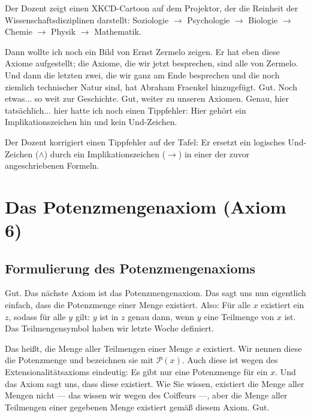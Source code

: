 \begin{meta-note}
Der Dozent zeigt einen XKCD-Cartoon auf dem Projektor, der die Reinheit der Wissenschaftsdisziplinen darstellt: Soziologie $\to$ Psychologie $\to$ Biologie $\to$ Chemie $\to$ Physik $\to$ Mathematik.
\end{meta-note}

\begin{spoken-clean}[00:41:07 - 00:41:37]
Dann wollte ich noch ein Bild von Ernst Zermelo zeigen. Er hat eben diese Axiome aufgestellt; die Axiome, die wir jetzt besprechen, sind alle von Zermelo. Und dann die letzten zwei, die wir ganz am Ende besprechen und die noch ziemlich technischer Natur sind, hat Abraham Fraenkel hinzugefügt. Gut. Noch etwas... so weit zur Geschichte. Gut, weiter zu unseren Axiomen. Genau, hier tatsächlich... hier hatte ich noch einen Tippfehler: Hier gehört ein Implikationszeichen hin und kein Und-Zeichen.
\end{spoken-clean}

\begin{meta-note}[Tafelkorrektur]
Der Dozent korrigiert einen Tippfehler auf der Tafel: Er ersetzt ein logisches Und-Zeichen ($\land$) durch ein Implikationszeichen ($\rightarrow$) in einer der zuvor angeschriebenen Formeln.
\end{meta-note}

\section{Das Potenzmengenaxiom (Axiom 6)}

\subsection{Formulierung des Potenzmengenaxioms}
\begin{spoken-clean}[00:41:37 - 00:43:31]
Gut. Das nächste Axiom ist das Potenzmengenaxiom. Das sagt uns nun eigentlich einfach, dass die Potenzmenge einer Menge existiert. Also: Für alle $x$ existiert ein $z$, sodass für alle $y$ gilt: $y$ ist in $z$ genau dann, wenn $y$ eine Teilmenge von $x$ ist. Das Teilmengensymbol haben wir letzte Woche definiert.

Das heißt, die Menge aller Teilmengen einer Menge $x$ existiert. Wir nennen diese die Potenzmenge und bezeichnen sie mit $\mathcal{P}(x)$. Auch diese ist wegen des Extensionalitätsaxioms eindeutig: Es gibt nur eine Potenzmenge für ein $x$. Und das Axiom sagt uns, dass diese existiert. Wie Sie wissen, existiert die Menge aller Mengen nicht --- das wissen wir wegen des Coiffeurs ---, aber die Menge aller Teilmengen einer gegebenen Menge existiert gemäß diesem Axiom. Gut.
\end{spoken-clean}

